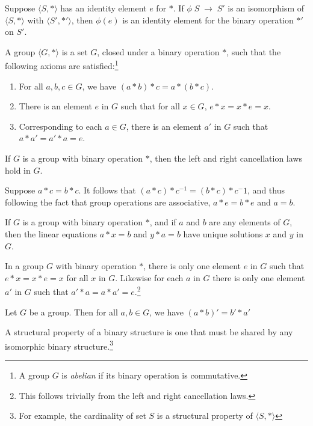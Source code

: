 \documentclass[nobib,notoc]{tufte-handout}
\begin{document}
\begin{thm}
	Suppose \(\langle S,*\rangle\) has an identity element \(e\) for \(*\). If \(\phi\;S\;\rightarrow\;S'\) is an isomorphism of \(\langle S,*\rangle\) with \(\langle S',*'\rangle\), then \(\phi(e)\) is an identity element for the binary operation \(*'\) on \(S'\).
\end{thm}
\begin{defi}[Group]
	A group \(\langle G,*\rangle\) is a set \(G\), closed under a binary operation \(*\), such that the following axioms are satisfied:\footnote{A group \(G\) is \emph{abelian} if its binary operation is commutative.}
\begin{enumerate}
	\item For all \(a,b,c\in G\), we have \((a*b)*c=a*(b*c)\).
	\item There is an element \(e\) in \(G\) such that for all \(x\in G\), \(e*x=x*e=x\).
	\item Corresponding to each \(a\in G\), there is an element \(a'\) in \(G\) such that \(a*a'=a'*a=e\).
\end{enumerate}
\end{defi}
\begin{thm}
		If \(G\) is a group with binary operation \(*\), then the left and right cancellation laws hold in \(G\).
		\begin{IEEEproof}
			Suppose \(a*c=b*c\). It follows that \((a*c)*c^{-1}=(b*c)*c^-1\), and thus following the fact that group operations are associative, \(a*e=b*e\) and \(a=b\).
		\end{IEEEproof}
\end{thm}
\begin{thm}
	If \(G\) is a group with binary operation \(*\), and if \(a\) and \(b\) are any elements of \(G\), then the linear equations \(a*x=b\) and \(y*a=b\) have unique solutions \(x\) and \(y\) in \(G\).
\end{thm}
\begin{thm}
	In a group \(G\) with binary operation \(*\), there is only one element \(e\) in \(G\) such that \(e*x=x*e=x\) for all \(x\) in \(G\). Likewise for each \(a\) in \(G\) there is only one element \(a'\) in \(G\) such that \(a'*a=a*a'=e\).\footnote{This follows trivially from the left and right cancellation laws.}
\end{thm}
\begin{cor}
	Let \(G\) be a group. Then for all \(a,b\in G\), we have \((a*b)'=b'*a'\)
\end{cor}
\begin{defi}
	A structural property of a binary structure is one that must be shared by any isomorphic binary structure.\footnote{For example, the cardinality of set \(S\) is a structural property of \(\langle S,*\rangle\)}
\end{defi}
\end{document}
